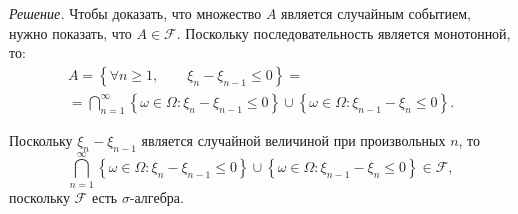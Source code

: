 \textit{Решение.} Чтобы доказать, что множество $A$ является случайным событием, нужно показать, что $A \in \mathcal{F} $.
Поскольку последовательность является монотонной, то:
\begin{equation*}
\begin{split}
A =
\left\{ \forall n \geq 1, \qquad \xi_n - \xi_{n-1} \leq 0 \right\} = \\
= \bigcap \limits_{n=1}^{ \infty } \left\{ \omega \in \Omega: \xi_n - \xi_{n-1} \leq 0 \right\} \cup \left\{ \omega \in \Omega: \xi_{n-1} - \xi_n \leq 0 \right\}.
\end{split}
\end{equation*}

Поскольку $ \xi_n - \xi_{n-1} $ является случайной величиной при произвольных $n$, то
$$ \bigcap \limits_{n=1}^{ \infty } \left\{ \omega \in \Omega: \xi_n - \xi_{n-1} \leq 0 \right\} \cup
\left\{ \omega \in \Omega: \xi_{n-1} - \xi_n \leq 0 \right\} \in \mathcal{F},$$
поскольку $ \mathcal{F} $ есть $ \sigma $-алгебра.

